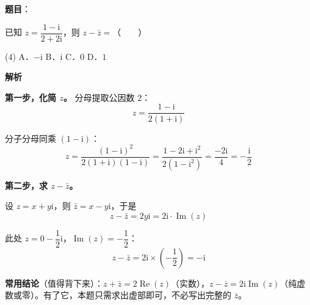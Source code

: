 \begin{answer}

\textbf{题目}：

已知 $z=\dfrac{1-\mathrm i}{2+2\mathrm i}$，则 $z-\bar z=$\mbox{（　　）}

\begin{gkopts}(4)
\task A．$-\mathrm i$
\task B．$\mathrm i$
\task C．$0$
\task D．$1$
\end{gkopts}

\textbf{解析}

\textbf{第一步，化简 $z$。} 分母提取公因数 $2$：
\nopagebreak[4]
\[z=\frac{1-\mathrm i}{2(1+\mathrm i)}\]

分子分母同乘 $(1-\mathrm i)$：
\nopagebreak[4]
\[z=\frac{(1-\mathrm i)^{2}}{2(1+\mathrm i)(1-\mathrm i)}=\frac{1-2\mathrm i+\mathrm i^{2}}{2\left(1-\mathrm i^{2}\right)}=\frac{-2\mathrm i}{4}=-\frac{\mathrm i}2\]

\textbf{第二步，求 $z-\bar z$。}

设 $z=x+y\mathrm i$，则 $\bar z=x-y\mathrm i$，于是
\nopagebreak[4]
\[z-\bar z=2y\mathrm i=2\mathrm i\cdot\operatorname{Im}(z)\]

此处 $z=0-\dfrac12\mathrm i$，$\operatorname{Im}(z)=-\dfrac12$：
\nopagebreak[4]
\[z-\bar z=2\mathrm i\times\left(-\frac12\right)=-\mathrm i\]

\begin{gktip}
\textbf{常用结论}（值得背下来）：$z+\bar z=2\operatorname{Re}(z)$（实数），$z-\bar z=2\mathrm i\operatorname{Im}(z)$（纯虚数或零）。有了它，本题只需求出虚部即可，不必写出完整的 $\bar z$。
\end{gktip}


\par\medskip

\end{answer}
